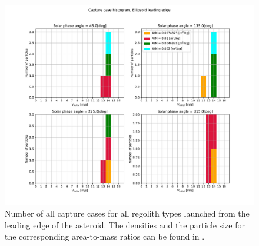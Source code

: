 \begin{figure}[htb]
\centering
\captionsetup{justification=centering}
\includegraphics[width=\textwidth, height=0.5\textheight, keepaspectratio=true]{leading_edge_perturbations/allCaptureCases.pdf}
\caption{Number of all capture cases for all regolith types launched from the leading edge of the asteroid. The densities and the particle size for the corresponding area-to-mass ratios can be found in .}
\label{fig:leadingEdge_allParticles_capture_hist}
\end{figure}
\FloatBarrier
